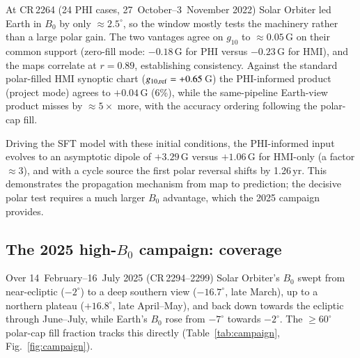 \documentclass{aa}
\begin{document}
At CR\,2264 (24 PHI cases, 27~October--3~November 2022) Solar Orbiter led Earth in $B_0$ by only $\approx 2.5^{\circ}$, so the window mostly tests the machinery rather than a large polar gain. The two vantages agree on $g_{10}$ to $\approx 0.05$\,G on their common support (zero-fill mode: $-0.18$\,G for PHI versus $-0.23$\,G for HMI), and the maps correlate at $r = 0.89$, establishing consistency. Against the standard polar-filled HMI synoptic chart ($g_{10,\rm ref} = +0.65$\,G) the PHI-informed product (project mode) agrees to $+0.04$\,G (6\%), while the same-pipeline Earth-view product misses by $\approx 5\times$ more, with the accuracy ordering following the polar-cap fill.

Driving the SFT model with these initial conditions, the PHI-informed input evolves to an asymptotic dipole of $+3.29$\,G versus $+1.06$\,G for HMI-only (a factor $\approx 3$), and with a cycle source the first polar reversal shifts by 1.26\,yr. This demonstrates the propagation mechanism from map to prediction; the decisive polar test requires a much larger $B_0$ advantage, which the 2025 campaign provides.

\subsection{The 2025 high-$B_0$ campaign: coverage}
\label{sec:results-coverage}

Over 14~February--16~July 2025 (CR\,2294--2299) Solar Orbiter's $B_0$ swept from near-ecliptic ($-2^{\circ}$) to a deep southern view ($-16.7^{\circ}$, late March), up to a northern plateau ($+16.8^{\circ}$, late April--May), and back down towards the ecliptic through June--July, while Earth's $B_0$ rose from $-7^{\circ}$ towards $-2^{\circ}$. The $\ge 60^{\circ}$ polar-cap fill fraction tracks this directly (Table~\ref{tab:campaign}, Fig.~\ref{fig:campaign}).
\end{document}
